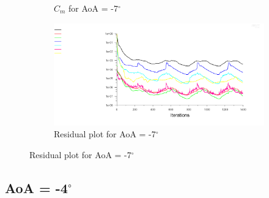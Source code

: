 \begin{figure}[H]
\begin{subfigure}[b]{0.5\textwidth}
    \caption{$C_m$ for AoA = -7$^\circ$}
    \label{fig:aoa_-7_cm}
  \end{subfigure}
  \begin{subfigure}[b]{0.5\textwidth}
    \includegraphics[width=\textwidth]{-7_deg/AoA_-7_resid.png}
    \caption{Residual plot for AoA = -7$^\circ$}
    \label{fig:aoa_-7_resid}
  \end{subfigure}
\end{figure}


\subsection*{AoA = -4$^\circ$}

